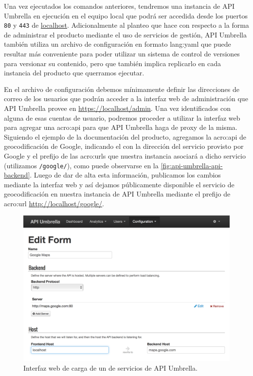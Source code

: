 
Una vez ejecutados los comandos anteriores, tendremos una instancia de API Umbrella en ejecución en el equipo local que podrá ser accedida desde los puertos \texttt{80} y \texttt{443} de \url{localhost}. Adicionalmente al planteo que  hace con respecto a la forma de administrar el producto mediante el uso de servicios de gestión, API Umbrella también utiliza un archivo de configuración en formato \gls{lang:yaml} que puede resultar más conveniente para poder utilizar un sistema de control de versiones para versionar su contenido, pero que también implica replicarlo en cada instancia del producto que querramos ejecutar.

En el archivo de configuración debemos mínimamente definir las direcciones de correo de los usuarios que podrán acceder a la interfaz web de administración que API Umbrella provee en \url{https://localhost/admin}. Una vez identificados con alguna de esas cuentas de usuario, podremos proceder a utilizar la interfaz web para agregar una \gls{acro:api} para que API Umbrella haga de proxy de la misma. Siguiendo el ejemplo de la documentación del producto, agregamos la \gls{acro:api} de geocodificación de Google, indicando el  con la dirección del servicio provisto por Google y el prefijo de las \glspl{acro:url} que nuestra instancia asociará a dicho servicio (utilizamos \texttt{/google/}), como puede observarse en la \autoref{fig:api-umbrella-api-backend}. Luego de dar de alta esta información, publicamos los cambios mediante la interfaz web y así dejamos públicamente disponible el servicio de geocodificación en nuestra instancia de API Umbrella mediante el prefijo de \gls{acro:url} \url{http://localhost/google/}.

\begin{figure}
  \includegraphics[width=\linewidth]{src/images/02-capitulo-2/tecnologias/api-umbrella/api-backend.png}
  \caption{Interfaz web de carga de un  de servicios de API Umbrella.}
  \label{fig:api-umbrella-api-backend}
\end{figure}

